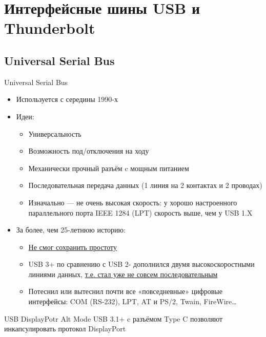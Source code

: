 \documentclass[xetex,aspectratio=43]{beamer}
\begin{document}
\section{Интерфейсные шины USB и Thunderbolt}

\subsection{Universal Serial Bus}

\begin{frame}{Universal Serial Bus}

\begin{itemize}
    \item Используется с середины 1990-х
    \item Идеи:
    \begin{itemize}
        \item Универсальность
        \item Возможность под/отключения на ходу
        \item Механически прочный разъём c мощным питанием
        \item \alert<2->{Последовательная передача данных (1 линия на 2 контактах и 2 проводах)}
        \item Изначально — не очень высокая скорость: у хорошо настроенного параллельного порта IEEE 1284 (LPT) скорость выше, чем у USB 1.X
    \end{itemize}
    \pause

    \item За более, чем 25-летнюю историю:
    \begin{itemize}
        \item \href{https://en.wikipedia.org/wiki/USB\#Connector_type_quick_reference}{Не смог сохранить простоту}
        \item \alert{USB 3+ по сравнению с USB 2- дополнился двумя высокоскоростными линиями данных}, \href{https://electronics.stackexchange.com/a/587798}{т.е. стал уже не совсем последовательным}
        \item Потеснил или вытеснил почти все «повседневные» цифровые интерфейсы: COM (RS-232), LPT, AT и PS/2, Twain, FireWire\ldots
    \end{itemize}
\end{itemize}

\end{frame}

\begin{frame}{USB DisplayPotr Alt Mode}
    USB 3.1+ c разъёмом Type C позволяют инкапсулировать протокол DisplayPort
\end{frame}
\end{document}
